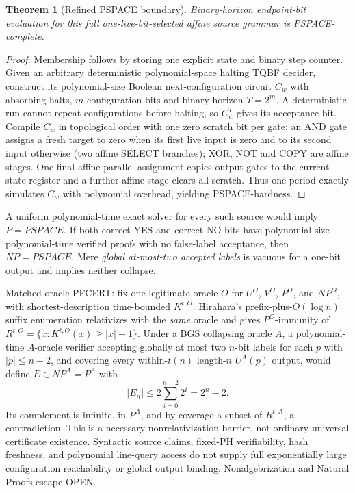 \documentclass[11pt]{article}
\newtheorem{theorem}{Theorem}
\begin{document}
\begin{theorem}[Refined PSPACE boundary]
Binary-horizon endpoint-bit evaluation for this full one-live-bit-selected affine source grammar is PSPACE-complete.
\end{theorem}
\begin{proof}
Membership follows by storing one explicit state and binary step counter. Given an arbitrary deterministic polynomial-space halting TQBF decider, construct its polynomial-size Boolean next-configuration circuit $C_w$ with absorbing halts, $m$ configuration bits and binary horizon $T=2^m$. A deterministic run cannot repeat configurations before halting, so $C_w^T$ gives its acceptance bit. Compile $C_w$ in topological order with one zero scratch bit per gate: an AND gate assigns a fresh target to zero when its first live input is zero and to its second input otherwise (two affine SELECT branches); XOR, NOT and COPY are affine stages. One final affine parallel assignment copies output gates to the current-state register and a further affine stage clears all scratch. Thus one period exactly simulates $C_w$ with polynomial overhead, yielding PSPACE-hardness.
\end{proof}
A uniform polynomial-time exact solver for every such source would imply $P=PSPACE$. If both correct YES and correct NO bits have polynomial-size polynomial-time verified proofs with no false-label acceptance, then $NP=PSPACE$. Mere \emph{global at-most-two accepted labels} is vacuous for a one-bit output and implies neither collapse.

Matched-oracle PFCERT: fix one legitimate oracle $O$ for $U^O$, $V^O$, $P^O$, and $NP^O$, with shortest-description time-bounded $K^{t,O}$. Hirahara's prefix-plus-$O(\log n)$ suffix enumeration relativizes with the \emph{same} oracle and gives $P^O$-immunity of $R^{t,O}=\{x:K^{t,O}(x)\ge|x|-1\}$. Under a BGS collapsing oracle $A$, a polynomial-time $A$-oracle verifier accepting globally at most two $n$-bit labels for each $p$ with $|p|\le n-2$, and covering every within-$t(n)$ length-$n$ $U^A(p)$ output, would define $E\in NP^A=P^A$ with
\[
|E_n|\le 2\sum_{i=0}^{n-2}2^i=2^n-2.
\]
Its complement is infinite, in $P^A$, and by coverage a subset of $R^{t,A}$, a contradiction. This is a necessary nonrelativization barrier, not ordinary universal certificate existence. Syntactic source claims, fixed-PH verifiability, hash freshness, and polynomial line-query access do not supply full exponentially large configuration reachability or global output binding. Nonalgebrization and Natural Proofs escape OPEN.
\end{document}
